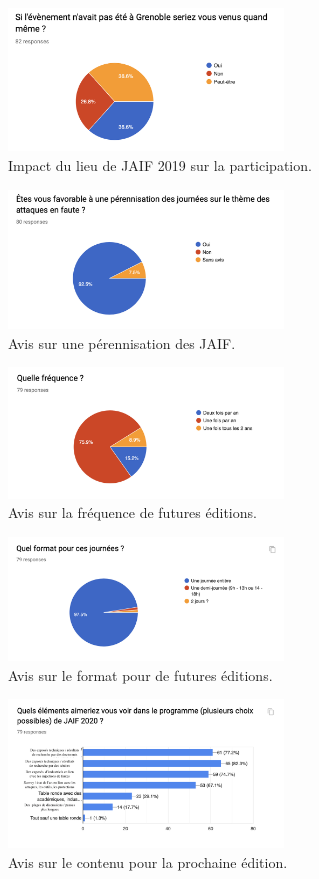 \documentclass[a4paper,11pt]{article}
\begin{document}
\begin{figure}[h]
\centering
\includegraphics[width=0.65\textwidth]{images/localisation_jaif2019.png}
\caption{Impact du lieu de JAIF 2019 sur la participation.}
\end{figure}

\begin{figure}[h]
\centering
\includegraphics[width=0.65\textwidth]{images/perennisation.png}
\caption{Avis sur une pérennisation des JAIF.}
\end{figure}

\begin{figure}[h]
\centering
\includegraphics[width=0.65\textwidth]{images/frequence.png}
\caption{Avis sur la fréquence de futures éditions.}
\end{figure}

\begin{figure}[h]
\centering
\includegraphics[width=0.65\textwidth]{images/format.png}
\caption{Avis sur le format pour de futures éditions.}
\end{figure}

\begin{figure}[h]
\centering
\includegraphics[width=0.65\textwidth]{images/contenu_jaif2020.png}
\caption{Avis sur le contenu pour la prochaine édition.}
\end{figure}
\end{document}
